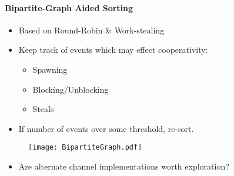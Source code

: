 \begin{slide}
    \framesubtitle{Bipartite-Graph Aided Sorting}
   
    \begin{multicols*}{2} 
        \begin{itemize}
            \item Based on Round-Robin \& Work-stealing
            \item Keep track of events which may effect cooperativity:
                \begin{itemize}
                    \item Spawning
                    \item Blocking/Unblocking
                    \item Steals
                \end{itemize}
            \item If number of events over some threshold, re-sort. 
        \end{itemize} 
    
        \begin{figure}
            \centering
            \texttt{[image: BipartiteGraph.pdf]}
            \vspace{5mm}
        \end{figure}
    \end{multicols*}

    \begin{itemize}
        \item[GOAL:]<2-> Are alternate channel implementations worth exploration?
    \end{itemize}

\end{slide}


